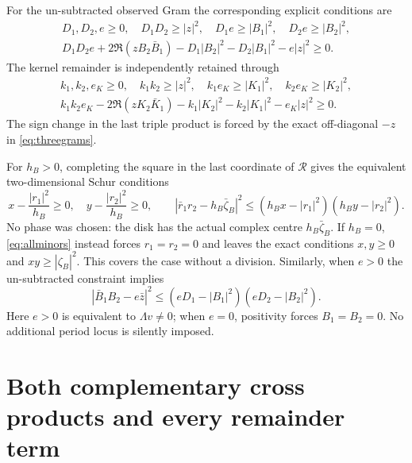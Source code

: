 \documentclass[11pt]{article}
\begin{document}
For the un-subtracted observed Gram the corresponding explicit conditions
are
\begin{equation}\label{eq:observedminors}
 \begin{gathered}
 D_1,D_2,e\ge0,\quad D_1D_2\ge|z|^2,\quad
 D_1e\ge|B_1|^2,\quad D_2e\ge|B_2|^2,\\
 D_1D_2e+2\Re(zB_2\bar B_1)
 -D_1|B_2|^2-D_2|B_1|^2-e|z|^2\ge0.
 \end{gathered}
\end{equation}
The kernel remainder is independently retained through
\begin{equation}\label{eq:kernelminors}
 \begin{gathered}
 k_1,k_2,e_K\ge0,\quad k_1k_2\ge|z|^2,\quad
 k_1e_K\ge|K_1|^2,\quad k_2e_K\ge|K_2|^2,\\
 k_1k_2e_K-2\Re(zK_2\bar K_1)
 -k_1|K_2|^2-k_2|K_1|^2-e_K|z|^2\ge0.
 \end{gathered}
\end{equation}
The sign change in the last triple product is forced by the exact
off-diagonal $-z$ in \eqref{eq:threegrams}.

For $h_B>0$, completing the square in the last coordinate of
$\mathcal R$ gives the equivalent two-dimensional Schur conditions
\begin{equation}\label{eq:resdisk}
 x-\frac{|r_1|^2}{h_B}\ge0,\quad
 y-\frac{|r_2|^2}{h_B}\ge0,\qquad
 \left|\bar r_1r_2-h_B\bar\zeta_B\right|^2
 \le(h_Bx-|r_1|^2)(h_By-|r_2|^2).
\end{equation}
No phase was chosen: the disk has the actual complex centre
$h_B\bar\zeta_B$.  If $h_B=0$, \eqref{eq:allminors} instead forces
$r_1=r_2=0$ and leaves the exact conditions $x,y\ge0$ and
$xy\ge|\zeta_B|^2$.  This covers the case without a division.
Similarly, when $e>0$ the un-subtracted constraint implies
\begin{equation}\label{eq:Bdisk}
 |\bar B_1B_2-e\bar z|^2
 \le(eD_1-|B_1|^2)(eD_2-|B_2|^2).
\end{equation}
Here $e>0$ is equivalent to $\Lambda v\ne0$; when $e=0$, positivity
forces $B_1=B_2=0$.  No additional period locus is silently imposed.

\section{Both complementary cross products and every remainder term}
\end{document}

